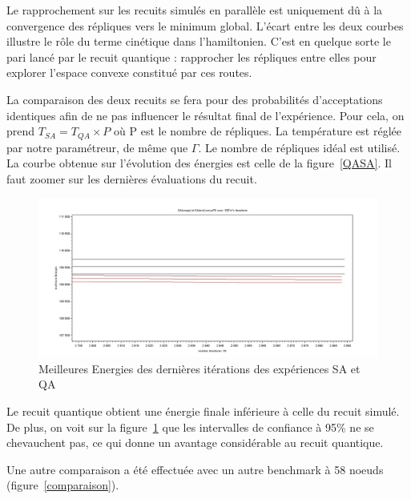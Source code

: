 \documentclass{article}%
\begin{document}
		Le rapprochement sur les recuits simulés en parallèle est uniquement dû à la convergence des répliques vers le minimum global. L'écart entre les deux courbes illustre le rôle du terme cinétique dans l'hamiltonien. C'est en quelque sorte le pari lancé par le recuit quantique : rapprocher les répliques entre elles pour explorer l'espace convexe constitué par ces routes.
		
		\vspace{1cm}
		La comparaison des deux recuits se fera pour des probabilités d'acceptations identiques afin de ne pas influencer le résultat final de l'expérience. Pour cela, on prend $T_{SA} = T_{QA} \times P $ où P est le nombre de répliques. La température est réglée par notre paramétreur, de même que $\Gamma$. Le nombre de répliques idéal est utilisé. La courbe obtenue sur l'évolution des énergies est celle de la figure~\ref{QASA}. Il faut zoomer sur les dernières évaluations du recuit.
		
	\begin{figure}[ht]
	
	\begin{center}
	\includegraphics[scale=0.25]{zoom_pr76.jpg}
	\caption{Meilleures Energies des dernières itérations des expériences SA et QA}
	\label{fin}

	\end{center}
		
	\end{figure}
	
		Le recuit quantique obtient une énergie finale inférieure à celle du recuit simulé. De plus, on voit sur la figure~\ref{fin} que les intervalles de confiance à 95\% ne se chevauchent pas, ce qui donne un avantage considérable au recuit quantique.
		
		Une autre comparaison a été effectuée avec un autre benchmark à 58 noeuds (figure~\ref{comparaison}).
	
\end{document}
